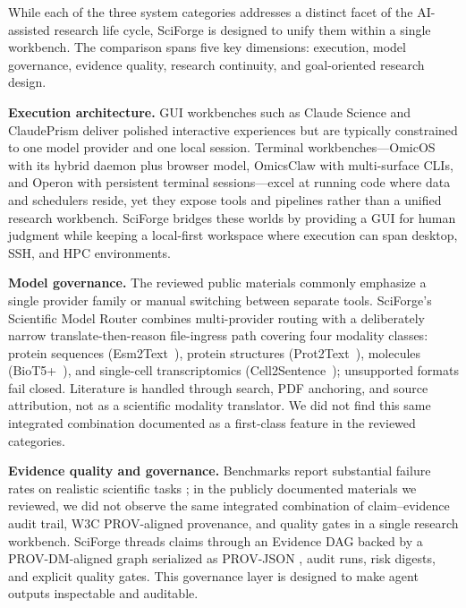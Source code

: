 \documentclass[sn-basic,Numbered,pdflatex]{sn-jnl}
\begin{document}
While each of the three system categories addresses a distinct facet of the AI-assisted research life cycle, SciForge is designed to unify them within a single workbench. The comparison spans five key dimensions: execution, model governance, evidence quality, research continuity, and goal-oriented research design.

\textbf{Execution architecture.} GUI workbenches such as Claude Science and ClaudePrism deliver polished interactive experiences but are typically constrained to one model provider and one local session. Terminal workbenches---OmicOS with its hybrid daemon plus browser model, OmicsClaw with multi-surface CLIs, and Operon with persistent terminal sessions---excel at running code where data and schedulers reside, yet they expose tools and pipelines rather than a unified research workbench. SciForge bridges these worlds by providing a GUI for human judgment while keeping a local-first workspace where execution can span desktop, SSH, and HPC environments.

\textbf{Model governance.} The reviewed public materials commonly emphasize a single provider family or manual switching between separate tools. SciForge's Scientific Model Router combines multi-provider routing with a deliberately narrow translate-then-reason file-ingress path covering four modality classes: protein sequences (Esm2Text~\cite{lin2023esm2}), protein structures (Prot2Text~\cite{abdine2023prot2text}), molecules (BioT5+~\cite{pei2024biot5}), and single-cell transcriptomics (Cell2Sentence~\cite{rizvi2025c2s}); unsupported formats fail closed. Literature is handled through search, PDF anchoring, and source attribution, not as a scientific modality translator. We did not find this same integrated combination documented as a first-class feature in the reviewed categories.

\textbf{Evidence quality and governance.} Benchmarks report substantial failure rates on realistic scientific tasks \cite{jansen2024discoveryworld,chen2025scienceagentbench}; in the publicly documented materials we reviewed, we did not observe the same integrated combination of claim--evidence audit trail, W3C PROV-aligned provenance, and quality gates in a single research workbench. SciForge threads claims through an Evidence DAG backed by a PROV-DM-aligned graph serialized as PROV-JSON \cite{w3cprov2013,huynh2013provjson}, audit runs, risk digests, and explicit quality gates. This governance layer is designed to make agent outputs inspectable and auditable.
\end{document}

